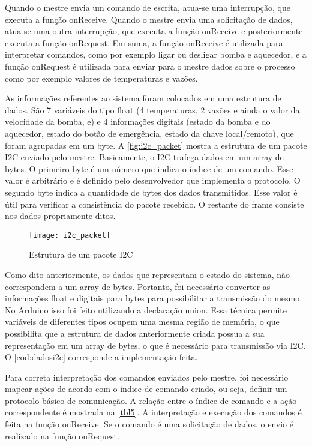 			Quando o mestre envia um comando de escrita, atua-se uma interrupção, que executa a função onReceive. Quando o mestre envia uma solicitação de dados, atua-se uma outra interrupção, que executa a função onReceive e posteriormente executa a função onRequest. Em suma, a função onReceive é utilizada para interpretar comandos, como por exemplo ligar ou desligar bomba e aquecedor, e a função onRequest é utilizada para enviar para o mestre dados sobre o processo como por exemplo valores de temperaturas e vazões.
			
			As informações referentes ao sistema foram colocados em uma estrutura de dados. São 7 variáveis do tipo float (4 temperaturas, 2 vazões e ainda o valor da velocidade da bomba, e) e 4 informações digitais (estado da bomba e do aquecedor, estado do botão de emergência, estado da chave local/remoto), que foram agrupadas em um byte. A \autoref{fig:i2c_packet} mostra a estrutura de um pacote I2C enviado pelo mestre. Basicamente, o I2C trafega dados em um array de bytes. O primeiro byte é um número que indica o índice de um comando. Esse valor é arbitrário e é definido pelo desenvolvedor que implementa o protocolo. O segundo byte indica a quantidade de bytes dos dados transmitidos. Esse valor é útil para verificar a consistência do pacote recebido. O restante do frame consiste nos dados propriamente ditos.
			
			\begin{figure}[!htb]	
				\captionsetup{justification=centering}
				\begin{center}
					\texttt{[image: i2c\_packet]}  %
					\caption[Estrutura de um pacote I2C]{\label{fig:i2c_packet}Estrutura de um pacote I2C}
				\end{center}		
			\end{figure}
			
			Como dito anteriormente, os dados que representam o estado do sistema, não correspondem a um array de bytes. Portanto, foi necessário converter as informações float e digitais para bytes para possibilitar a transmissão do mesmo. No Arduino isso foi feito utilizando a declaração union. Essa técnica permite variáveis de diferentes tipos ocupem uma mesma região de memória, o que possibilita que a estrutura de dados anteriormente criada possua a sua representação em um array de bytes, o que é necessário para transmissão via I2C. O \autoref{cod:dadosi2c} corresponde a implementação feita.
			
			Para correta interpretação dos comandos enviados pelo mestre, foi necessário mapear ações de acordo com o índice de comando criado, ou seja, definir um protocolo básico de comunicação.
			A relação entre o índice de comando e a ação correspondente é mostrada na \autoref{tbl5}. A interpretação e execução dos comandos é feita na função onReceive. Se o comando é uma solicitação de dados, o envio é realizado na função onRequest.
						

